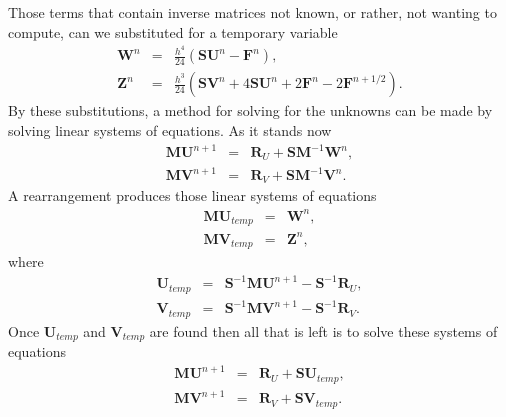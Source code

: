 Those terms that contain inverse matrices not known, or rather, not wanting to compute, can we substituted for a temporary variable
\begin{eqnarray*}
  \bm{W}^n & = & \frac{h^4}{24}(\bm{SU}^n - \bm{F}^n), \\
  \bm{Z}^n & = & \frac{h^3}{24}(\bm{SV}^n + 4\bm{SU}^n + 2\bm{F}^n - 2\bm{F}^{n+1/2}).
\end{eqnarray*}
By these substitutions, a method for solving for the unknowns can be made by solving linear systems of equations. As it stands now
\begin{eqnarray*}
  \bm{MU}^{n+1} & = & \bm{R}_U + \bm{SM}^{-1}\bm{W}^n, \\
  \bm{MV}^{n+1} & = & \bm{R}_V + \bm{SM}^{-1}\bm{V}^n.
\end{eqnarray*}
A rearrangement produces those linear systems of equations
\begin{eqnarray*}
  \bm{M}\bm{U}_{temp} & = & \bm{W}^n, \\
  \bm{M}\bm{V}_{temp} & = & \bm{Z}^n,
\end{eqnarray*}
where
\begin{eqnarray*}
  \bm{U}_{temp} & = & \bm{S}^{-1}\bm{MU}^{n+1} - \bm{S}^{-1}\bm{R}_U, \\
  \bm{V}_{temp} & = & \bm{S}^{-1}\bm{MV}^{n+1} - \bm{S}^{-1}\bm{R}_V.
\end{eqnarray*}
Once $\bm{U}_{temp}$ and $\bm{V}_{temp}$ are found then all that is left is to solve these systems of equations
\begin{eqnarray*}
  \bm{MU}^{n+1} & = & \bm{R}_U + \bm{SU}_{temp}, \\
  \bm{MV}^{n+1} & = & \bm{R}_V + \bm{SV}_{temp}.
\end{eqnarray*}
